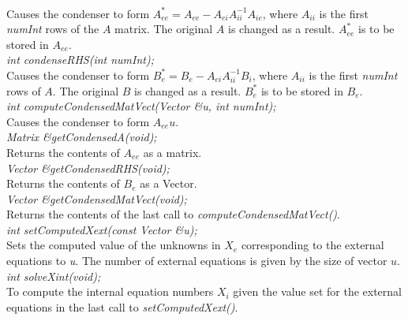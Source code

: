   \\
  \\

 \\
\\ 

  \\
 \\
Causes the condenser to form $A_{ee}^* = A_{ee} -A_{ei} A_{ii}^{-1} A_{ie}$, where
$A_{ii}$ is the first {\em numInt} rows of the $A$ matrix.  The
original $A$ is changed as a result. $A_{ee}^*$ is to be stored in $A_{ee}$. \\

{\em int condenseRHS(int numInt);} \\
Causes the condenser to form $B_e^* = B_e - A_{ei} A_{ii}^{-1} B_i$, where $A_{ii}$ 
is the first {\em numInt} rows of $A$. The original $B$ is changed as a result. 
$B_e^*$ is to be stored in $B_e$. \\

{\em int computeCondensedMatVect(Vector \&u, int numInt);} \\
Causes the condenser to form $A_{ee} u$. \\

{\em Matrix \&getCondensedA(void);} \\
Returns the contents of $A_{ee}$ as a matrix. \\

{\em Vector \&getCondensedRHS(void);} \\
Returns the contents of $B_e$ as a Vector. \\

{\em Vector \&getCondensedMatVect(void);} \\
Returns the contents of the last call to {\em
computeCondensedMatVect()}. \\

{\em int setComputedXext(const Vector \&u);} \\
Sets the computed value of the unknowns in $X_e$ corresponding to the
external equations to {\em u}. The number of external equations is
given by the size of vector $u$.\\

{\em  int solveXint(void);} \\
To compute the internal equation numbers $X_i$ given the value set
for the external equations in the last call to {\em setComputedXext()}. \\


